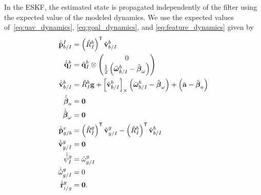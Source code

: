 In the ESKF, the estimated state is propagated independently of the filter using
the expected value of the modeled dynamics. We use the expected values
of~\eqref{eq:uav_dynamics}, \eqref{eq:goal_dynamics}, and
\eqref{eq:feature_dynamics} given by
\begin{align}
  \dot{\hat{\boldsymbol{\mathrm{p}}}}_{b/I}^I
  &=
  \left( \hat{R}_I^b \right)^{\mathsf{T}} \hat{\boldsymbol{\mathrm{v}}}_{b/I}^b
  \label{eq:estimated_dynamics}
  \\
  \dot{\hat{\boldsymbol{\mathrm{q}}}}_{I}^{b} 
  &= 	
  \hat{\boldsymbol{\mathrm{q}}}_I^b \otimes \begin{pmatrix} 0 \\ \frac{1}{2}
  \left( \bar{\boldsymbol{\mathrm{\omega}}}_{b/I}^b - \hat{\boldsymbol{\mathrm{\beta}}}_\omega \right)
\end{pmatrix} \nonumber \\
  \dot{\hat{\boldsymbol{\mathrm{v}}}}_{b/I}^b 
  &=
  \hat{R}_I^b \boldsymbol{\mathrm{g}}
  +
  \left[ \hat{\boldsymbol{\mathrm{v}}}_{b/I}^b \right]_{\times}
  \left( \bar{\boldsymbol{\mathrm{\omega}}}_{b/I}^b - \hat{\boldsymbol{\mathrm{\beta}}}_\omega \right)
  +
  \left( \bar{\boldsymbol{\mathrm{a}}} - \hat{\boldsymbol{\mathrm{\beta}}}_a \right) \nonumber
  \\
  \dot{\hat{\boldsymbol{\mathrm{\beta}}}}_a &= \boldsymbol{\mathrm{0}} \nonumber
  \\
  \dot{\hat{\boldsymbol{\mathrm{\beta}}}}_\omega &= \boldsymbol{\mathrm{0}} \nonumber
  \\
  \dot{\hat{\boldsymbol{\mathrm{p}}}}_{g/b}^{v} &= \left( \hat{R}_{I}^{g} \right)^{\mathsf{T}}
  \hat{\boldsymbol{\mathrm{v}}}_{g/I}^{g} - \left( \hat{R}_{I}^{b} \right)^{\mathsf{T}}
  \hat{\boldsymbol{\mathrm{v}}}_{b/I}^{b} \nonumber \\
  \dot{\hat{\boldsymbol{\mathrm{v}}}}_{g/I}^{g} &= \boldsymbol{\mathrm{0}} \nonumber \\
  \dot{\hat{\psi}}_{I}^{g} &= \hat{\omega}_{g/I}^g \nonumber \\
  \dot{\hat{\omega}}_{g/I}^{g} &= 0 \nonumber \\
  \dot{\hat{\boldsymbol{\mathrm{r}}}}_{i/g}^g &= \boldsymbol{\mathrm{0}}. \nonumber
\end{align}

